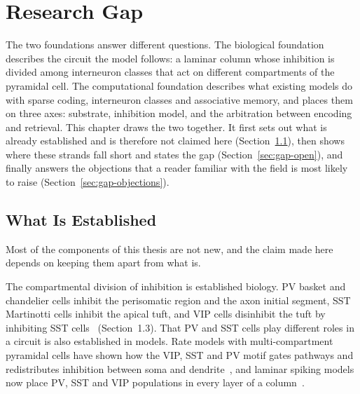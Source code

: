 \providecommand{\unitname}{chapter}
\providecommand{\xsec}[2]{#1}
\providecommand{\aimref}{the following chapter}

\chapter{Research Gap}
\label{chap:gap}

The two foundations answer different questions. The biological foundation
describes the circuit the model follows: a laminar column whose inhibition is
divided among interneuron classes that act on different compartments of the
pyramidal cell. The computational foundation describes what existing models do
with sparse coding, interneuron classes and associative memory, and places them
on three axes: substrate, inhibition model, and the arbitration between
encoding and retrieval. This \unitname{} draws the two together. It first sets
out what is already established and is therefore not claimed here
(Section~\ref{sec:gap-established}), then shows where these strands fall
short and states the gap (Section~\ref{sec:gap-open}), and finally answers the objections that a reader
familiar with the field is most likely to raise
(Section~\ref{sec:gap-objections}).

\section{What Is Established}
\label{sec:gap-established}

Most of the components of this thesis are not new, and the claim made here
depends on keeping them apart from what is.

The compartmental division of inhibition is established biology. PV basket and
chandelier cells inhibit the perisomatic region and the axon initial segment,
SST Martinotti cells inhibit the apical tuft, and VIP cells disinhibit the tuft
by inhibiting SST cells~\cite{tremblay2016}
(Section~\xsec{1.3}{sec:bio-inhibitory}). That PV and SST cells play different
roles in a circuit is also established in models. Rate models with
multi-compartment pyramidal cells have shown how the VIP, SST and PV motif
gates pathways and redistributes inhibition between soma and
dendrite~\cite{yang2016gating,hertag2019amplifying}, and laminar spiking models
now place PV, SST and VIP populations in every layer of a
column~\cite{billeh2020systematic,moreni2025celltype}.

